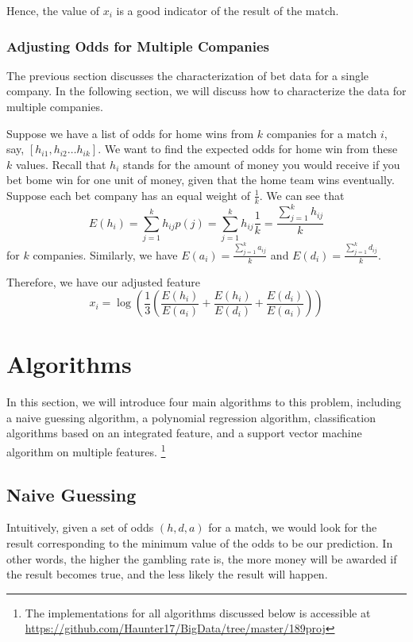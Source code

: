 \documentclass{article}
\begin{document}
	Hence, the value of $x_i$ is a good indicator of the result of the match.
	\subsubsection{Adjusting Odds for Multiple Companies}
	\label{multi_comp}
	The previous section discusses the characterization of bet data for a single company. In the following section, we will discuss how to characterize the data for multiple companies.
	
	Suppose we have a list of odds for home wins from $k$ companies for a match $i$, say, $[h_{i1}, h_{i2} \ldots h_{ik}]$. We want to find the expected odds for home win from these $k$ values. Recall that $h_i$ stands for the amount of money you would receive if you bet bome win for one unit of money, given that the home team wins eventually. Suppose each bet company has an equal weight of $\frac{1}{k}$. We can see that \[
	E(h_i) = \sum_{j = 1}^{k}h_{ij}p(j) = \sum_{j = 1}^{k}h_{ij}\frac{1}{k} = \frac{\sum_{j = 1}^{k}h_{ij}}{k}
	\]
	for $k$ companies. Similarly, we have $
	E(a_i) = \frac{\sum_{j = 1}^{k}a_{ij}}{k}$ and $ E(d_i) = \frac{\sum_{j = 1}^{k}d_{ij}}{k}$.
	
	Therefore, we have our adjusted feature \[
	x_i = \log(\frac{1}{3}(\frac{E(h_i)}{E(a_i)} + \frac{E(h_i)}{E(d_i)} + \frac{E(d_i)}{E(a_i)}))
	\]
	
	
	
	\section{Algorithms}
	
	In this section, we will introduce four main algorithms to this problem, including a naive guessing algorithm, a polynomial regression algorithm, classification algorithms based on an integrated feature, and a support vector machine algorithm on multiple features. \footnote{The implementations for all algorithms discussed below is accessible at \url{https://github.com/Haunter17/BigData/tree/master/189proj}}
	
\subsection{Naive Guessing}

Intuitively, given a set of odds $(h, d, a)$ for a match, we would look for the result corresponding to the minimum value of the odds to be our prediction. In other words, the higher the gambling rate is, the more money will be awarded if the result becomes true, and the less likely the result will happen.
\end{document}
